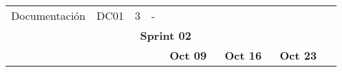 \begin{longtable}[c]{llclllllllllllllllll}
        \multicolumn{1}{|l|}{Documentación}                                                                                     & \multicolumn{1}{l|}{DC01}                                                      & \multicolumn{1}{c|}{3}                                                           & \multicolumn{1}{l|}{-}                                                               & \cellcolor[HTML]{C9C9C9}        & \cellcolor[HTML]{C9C9C9}        & \cellcolor[HTML]{C9C9C9}        & \cellcolor[HTML]{C9C9C9}        & \cellcolor[HTML]{C9C9C9}        & \cellcolor[HTML]{C9C9C9}        & \cellcolor[HTML]{C9C9C9}        & \cellcolor[HTML]{C9C9C9}        & \cellcolor[HTML]{C9C9C9}        & \cellcolor[HTML]{C9C9C9}        & \cellcolor[HTML]{C9C9C9}        & \cellcolor[HTML]{C9C9C9}        & \cellcolor[HTML]{C9C9C9}        & \cellcolor[HTML]{C9C9C9}        & \multicolumn{1}{l|}{\cellcolor[HTML]{C9C9C9}} &  \\ \cline{1-19}
        \multicolumn{19}{|c|}{\cellcolor[HTML]{8EA9D8}\textbf{Sprint 02}}                                                                                                                                                                                                                                                                                                                                                                                                                                                                                                                                                                                                                                                                                                                                                                                                                                                              &  \\ \cline{1-19}
        \multicolumn{1}{|c|}{\cellcolor[HTML]{FFFFFF}}                                                                          & \multicolumn{1}{c|}{\cellcolor[HTML]{FFFFFF}}                                  & \multicolumn{1}{c|}{\cellcolor[HTML]{FFFFFF}}                                    & \multicolumn{1}{c|}{\cellcolor[HTML]{FFFFFF}}                                        & \multicolumn{5}{c|}{\textbf{Oct 09}}                                                                                                                                    & \multicolumn{5}{c|}{\textbf{Oct 16}}                                                                                                                                    & \multicolumn{5}{c|}{\textbf{Oct 23}}                                                                                                                                                  &  \\ \cline{5-19}

\end{longtable}
